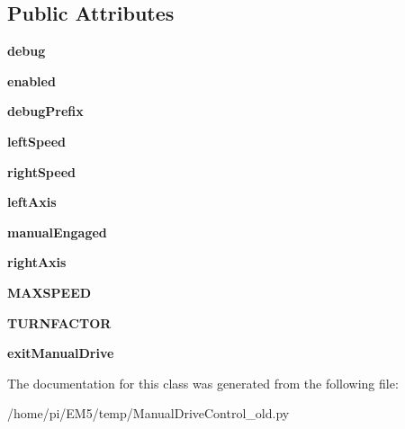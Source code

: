 \subsection*{Public Attributes}
\begin{DoxyCompactItemize}
\item 
\mbox{\label{classManualDriveControl__old_1_1ManualDriveControl_a6136c4217c5d00ef0fe1018158ea4471}} 
{\bfseries debug}
\item 
\mbox{\label{classManualDriveControl__old_1_1ManualDriveControl_a3b7a37561fe885f43b0ed9fee92225fc}} 
{\bfseries enabled}
\item 
\mbox{\label{classManualDriveControl__old_1_1ManualDriveControl_ab41024c3506ec8ffa8df88cb756eebce}} 
{\bfseries debug\+Prefix}
\item 
\mbox{\label{classManualDriveControl__old_1_1ManualDriveControl_a24db5858a019568dc6c9846eb829462b}} 
{\bfseries left\+Speed}
\item 
\mbox{\label{classManualDriveControl__old_1_1ManualDriveControl_a0b6cce922cdde5ff1eeb1b50b2c1e779}} 
{\bfseries right\+Speed}
\item 
\mbox{\label{classManualDriveControl__old_1_1ManualDriveControl_a29842391ba7e3a372f7e68406bdf30b7}} 
{\bfseries left\+Axis}
\item 
\mbox{\label{classManualDriveControl__old_1_1ManualDriveControl_a835a36cd0cedc4ece9ba2b333cb5e616}} 
{\bfseries manual\+Engaged}
\item 
\mbox{\label{classManualDriveControl__old_1_1ManualDriveControl_a0227a324d3ab75195bae36fc6f43bf73}} 
{\bfseries right\+Axis}
\item 
\mbox{\label{classManualDriveControl__old_1_1ManualDriveControl_a1e55574c73d8b66e4c1bb745fa702778}} 
{\bfseries M\+A\+X\+S\+P\+E\+ED}
\item 
\mbox{\label{classManualDriveControl__old_1_1ManualDriveControl_a02d33a8d6cb6b6ca5cabeea4a6f7b0bb}} 
{\bfseries T\+U\+R\+N\+F\+A\+C\+T\+OR}
\item 
\mbox{\label{classManualDriveControl__old_1_1ManualDriveControl_aa019b01dbe462d28639449f44147a15e}} 
{\bfseries exit\+Manual\+Drive}
\end{DoxyCompactItemize}


The documentation for this class was generated from the following file\+:\begin{DoxyCompactItemize}
\item 
/home/pi/\+E\+M5/temp/Manual\+Drive\+Control\+\_\+old.\+py\end{DoxyCompactItemize}
